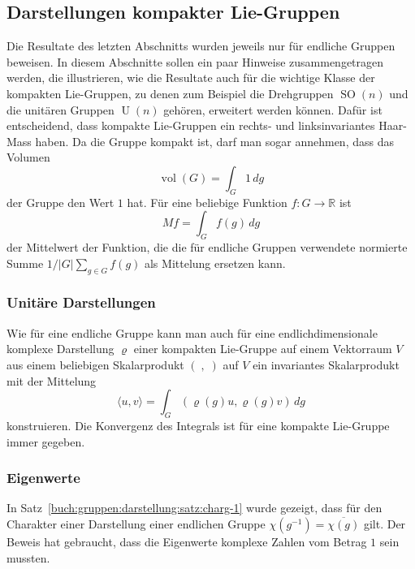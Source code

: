 %
%
%

%
%
\subsection{Darstellungen kompakter Lie-Gruppen}
Die Resultate des letzten Abschnitts wurden jeweils nur für endliche Gruppen
beweisen.
In diesem Abschnitte sollen ein paar Hinweise zusammengetragen werden,
die illustrieren, wie die Resultate auch für die wichtige Klasse
der kompakten Lie-Gruppen, zu denen zum Beispiel die Drehgruppen
$\operatorname{SO}(n)$ und die unitären Gruppen $\operatorname{U}(n)$
gehören, erweitert werden können.
Dafür ist entscheidend, dass kompakte Lie-Gruppen ein rechts- und
linksinvariantes Haar-Mass haben.
Da die Gruppe kompakt ist, darf man sogar annehmen, dass das
Volumen
\[
\operatorname{vol}(G)
=
\int_G 1\, dg
\]
der Gruppe den Wert $1$ hat.
Für eine beliebige Funktion $f\colon G\to \mathbb{R}$ ist
\[
Mf
=
\int_G f(g)\,dg
\]
der Mittelwert der Funktion, die die für endliche Gruppen verwendete
normierte Summe $1/|G| \sum_{g\in G}f(g)$ als Mittelung ersetzen kann.

%
%
\subsubsection{Unitäre Darstellungen}
Wie für eine endliche Gruppe kann man auch für eine endlichdimensionale
komplexe Darstellung $\varrho$ einer kompakten Lie-Gruppe auf einem
Vektorraum $V$ aus einem beliebigen Skalarprodukt $(\;,\;)$ auf $V$
ein invariantes Skalarprodukt mit der Mittelung
\begin{equation}
\langle u,v\rangle
=
\int_G (\varrho(g)u,\varrho(g)v)\,dg
\label{buch:gruppen:darstellungen:eqn:invskalarprodukt}
\end{equation}
konstruieren.
Die Konvergenz des Integrals ist für eine kompakte Lie-Gruppe immer 
gegeben.


%
%
\subsubsection{Eigenwerte}
In Satz~\ref{buch:gruppen:darstellung:satz:charg-1} wurde gezeigt,
dass für den Charakter einer Darstellung einer endlichen Gruppe
$\chi(g^{-1})=\overline{\chi(g)}$ gilt.
Der Beweis hat gebraucht, dass die Eigenwerte komplexe Zahlen vom
Betrag $1$ sein mussten.

